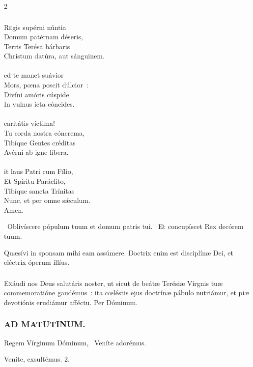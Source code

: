 \documentclass[9pt,twoside]{extarticle}
\begin{document}
\begin{multicols}{2}
{\subsubsection*{\center {}}
\begin{center}\end{center}
\lettrine{R}egis supérni núntia\\
Domum patérnam déseris,\\
Terris Terésa bárbaris\\
Christum datúra, aut sánguinem.\\
\\
ed te manet suávior\\
Mors, pœna poscit dúlcior~:\\
Divíni amóris cúspide\\
In vulnus icta cóncides.\\
\\
 caritátis víctima!\\
Tu corda nostra cóncrema,\\
Tibíque Gentes créditas\\
Avérni ab igne líbera.\\
\\
it laus Patri cum Fílio,\\
Et Spíritu Paráclito,\\
Tibíque sancta Trínitas\\
Nunc, et per omne sǽculum.\\
Amen.

\begin{tightlist}{}
\item {}~Oblivíscere pópulum tuum et domum patris tui. ~Et concupíscet Rex decórem tuum.
\item {} Quæsívi in sponsam mihi eam assúmere. Doctrix enim est disciplínæ Dei, et eléctrix óperum illíus.
\end{tightlist}

\subsubsection*{\center {}}
\lettrine{E}xáudi nos Deus salutáris noster, ut sicut de beátæ Terésiæ Vírgnis tuæ commemoratióne gaudémus~: ita cœléstis ejus doctrínæ pábulo nutriámur, et piæ devotiónis erudiámur afféctu. Per Dóminum.

\subsubsection*{\center \textsc{AD MATUTINUM.}}
\begin{tightlist}{}
\item {} Regem Vírginum Dóminum, \textred{*}~Veníte adorémus.
\item {} Veníte, exsultémus. 2.
\item {}
\end{tightlist}

}
\end{multicols}
\end{document}
